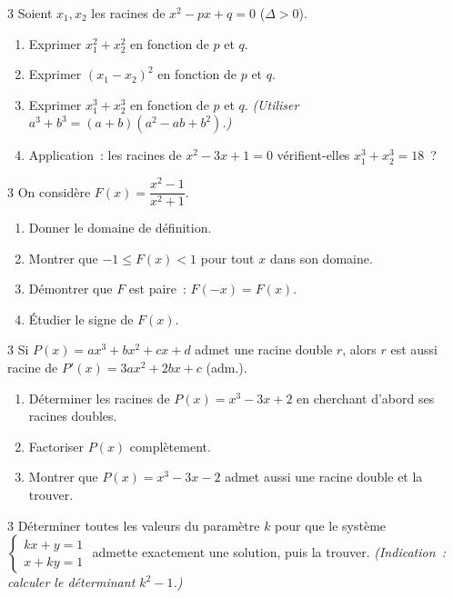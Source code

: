 \begin{exo}{3}
Soient $x_1, x_2$ les racines de $x^2 - px + q = 0$ ($\Delta > 0$).
\begin{enumerate}
  \item Exprimer $x_1^2 + x_2^2$ en fonction de $p$ et $q$.
  \item Exprimer $(x_1-x_2)^2$ en fonction de $p$ et $q$.
  \item Exprimer $x_1^3 + x_2^3$ en fonction de $p$ et $q$.
        \emph{(Utiliser $a^3+b^3 = (a+b)(a^2-ab+b^2)$.)}
  \item Application~: les racines de $x^2 - 3x + 1 = 0$ v\'erifient-elles
        $x_1^3 + x_2^3 = 18$~?
\end{enumerate}
\end{exo}

\begin{exo}{3}
On consid\`ere $F(x) = \dfrac{x^2-1}{x^2+1}$.
\begin{enumerate}
  \item Donner le domaine de d\'efinition.
  \item Montrer que $-1 \leq F(x) < 1$ pour tout $x$ dans son domaine.
  \item D\'emontrer que $F$ est paire~: $F(-x) = F(x)$.
  \item \'Etudier le signe de $F(x)$.
\end{enumerate}
\end{exo}

\begin{exo}{3}
Si $P(x) = ax^3+bx^2+cx+d$ admet une racine double $r$, alors $r$ est aussi
racine de $P'(x) = 3ax^2+2bx+c$ (adm.).
\begin{enumerate}
  \item D\'eterminer les racines de $P(x) = x^3 - 3x + 2$
        en cherchant d'abord ses racines doubles.
  \item Factoriser $P(x)$ compl\`etement.
  \item Montrer que $P(x) = x^3 - 3x - 2$ admet aussi une racine double et la trouver.
\end{enumerate}
\end{exo}

\begin{exo}{3}
D\'eterminer toutes les valeurs du param\`etre $k$ pour que le syst\`eme
$\begin{cases}kx + y = 1 \\ x + ky = 1\end{cases}$
admette exactement une solution, puis la trouver.
\emph{(Indication~: calculer le d\'eterminant $k^2-1$.)}
\end{exo}

